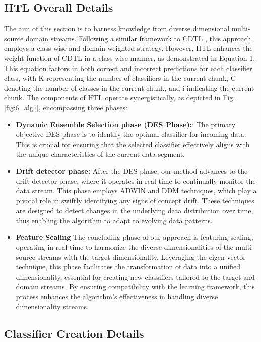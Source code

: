 \subsection{HTL Overall Details}

The aim of this section is to harness knowledge from diverse dimensional multi-source domain streams. Following a similar framework to CDTL \cite{yang2021concept}, this approach employs a class-wise and domain-weighted strategy. However, HTL enhances the weight function of CDTL in a class-wise manner, as demonstrated in Equation 1. This equation factors in both correct and incorrect predictions for each classifier class, with K representing the number of classifiers in the current chunk, C denoting the number of classes in the current chunk, and i indicating the current chunk. The components of HTL operate synergistically, as depicted in Fig. \ref{fig:6_alg1}, encompassing three phases:
\begin{itemize}
	\item \textbf{Dynamic Ensemble Selection phase (DES Phase):}: The primary objective DES phase is to identify the optimal classifier for incoming data. This is crucial for ensuring that the selected classifier effectively aligns with the unique characteristics of the current data segment.
	\item \textbf{Drift detector phase:} After the DES phase, our method advances to the drift detector phase, where it operates in real-time to continually monitor the data stream. This phase employs ADWIN and DDM techniques, which play a pivotal role in swiftly identifying any signs of concept drift. These techniques are designed to detect changes in the underlying data distribution over time, thus enabling the algorithm to adapt to evolving data patterns.
	\item \textbf{Feature Scaling} The concluding phase of our approach is featuring scaling, operating in real-time to harmonize the diverse dimensionalities of the multi-source streams with the target dimensionality. Leveraging the eigen vector technique, this phase facilitates the transformation of data into a unified dimensionality, essential for creating new classifiers tailored to the target and domain streams. By ensuring compatibility with the learning framework, this process enhances the algorithm's effectiveness in handling diverse dimensionality streams.
\end{itemize}
\subsection{Classifier Creation Details }

